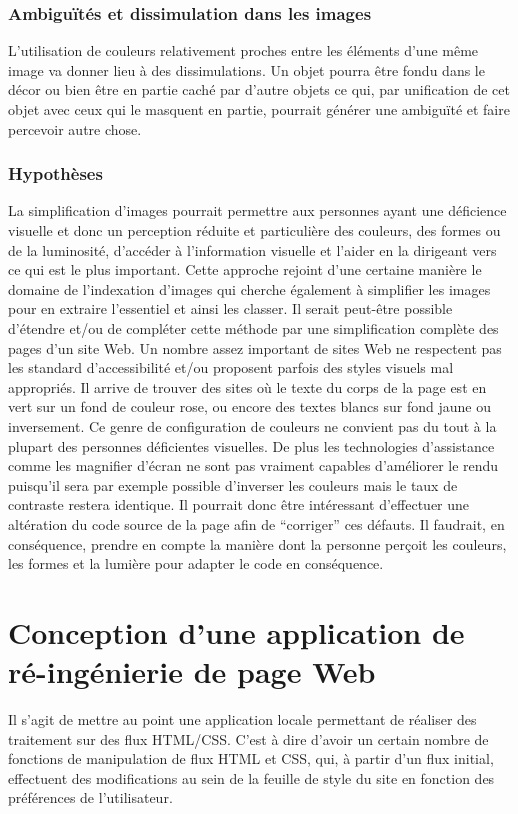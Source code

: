 \documentclass[french,a4paper]{report}
\begin{document}
{\subsection{Ambiguïtés et dissimulation dans les images}
L'utilisation de couleurs relativement proches entre les éléments d'une même image va donner lieu à des dissimulations. Un objet pourra être fondu dans le décor ou bien être en partie caché par d'autre objets ce qui, par unification de cet objet avec ceux qui le masquent en partie, pourrait générer une ambiguïté et faire percevoir autre chose.
\subsection{Hypothèses}
La simplification d'images pourrait permettre aux personnes ayant une déficience visuelle et donc un perception réduite et particulière des couleurs, des formes ou de la luminosité, d'accéder à l'information visuelle et l'aider en la dirigeant vers ce qui est le plus important.
\newline
Cette approche rejoint d'une certaine manière le domaine de l'indexation d'images qui cherche également à simplifier les images pour en extraire l'essentiel et ainsi les classer.
\newline
Il serait peut-être possible d'étendre et/ou de compléter cette méthode par une
simplification complète des pages d'un site Web.
\newline
Un nombre assez important de sites Web ne respectent pas les standard
d'accessibilité et/ou proposent parfois des styles visuels mal appropriés. Il
arrive de trouver des sites où le texte du corps de la page est en vert sur un
fond de couleur rose, ou encore des textes blancs sur fond jaune ou
inversement. Ce genre de configuration de couleurs ne convient pas du tout à la
plupart des personnes déficientes visuelles. De plus les technologies
d'assistance comme les magnifier d'écran ne sont pas vraiment capables
d'améliorer le rendu puisqu'il sera par exemple possible d'inverser les couleurs
mais le taux de contraste restera identique. \newline
Il pourrait donc être intéressant d'effectuer une altération du code source de
la page afin de \enquote{corriger} ces défauts. Il faudrait, en conséquence, prendre en
compte la manière dont la personne perçoit les couleurs, les formes et la
lumière pour adapter le code en conséquence.
\chapter{Conception d'une application de ré-ingénierie de page Web}
\label{chpconceptionweb}
Il s'agit de mettre au point une application locale permettant de
réaliser des traitement sur des flux HTML/CSS. C'est à dire d'avoir un
certain nombre de fonctions de manipulation de flux HTML et CSS, qui,
à partir d'un flux initial, effectuent des modifications au sein de la
feuille de style du site en fonction des préférences de l'utilisateur.
\newline
}
\end{document}
